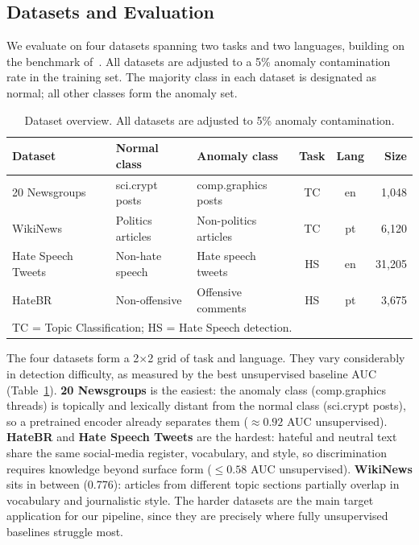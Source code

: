 \documentclass[12pt]{article}
\begin{document}
\subsection{Datasets and Evaluation}
\label{sec:datasets}

We evaluate on four datasets spanning two tasks and two languages,
building on the benchmark of~\cite{stil}. All datasets are adjusted to a 5\% anomaly
contamination rate in the training set. The majority class in each dataset is designated
as normal; all other classes form the anomaly set.

\renewcommand{\arraystretch}{0.9}
\begin{table}[ht]
\small
\centering
\caption{Dataset overview. All datasets are adjusted to 5\% anomaly contamination.}
\label{tab:datasets}
\begin{tabular}{lp{2.2cm}p{2.2cm}ccr}
\toprule
\textbf{Dataset} & \textbf{Normal class} & \textbf{Anomaly class} & \textbf{Task} & \textbf{Lang} & \textbf{Size} \\
\midrule
20 Newsgroups~\cite{lang1995newsweeder}          & sci.crypt posts   & comp.graphics posts   & TC & en & 1,048  \\
WikiNews~\cite{10.1371/journal.pone.0296929}     & Politics articles & Non-politics articles & TC & pt & 6,120  \\
Hate Speech Tweets~\cite{sharma2018hate}         & Non-hate speech   & Hate speech tweets    & HS & en & 31,205 \\
HateBR~\cite{DBLP:journals/corr/abs-2010-04543} & Non-offensive     & Offensive comments    & HS & pt & 3,675  \\
\bottomrule
\multicolumn{6}{l}{\scriptsize TC = Topic Classification; HS = Hate Speech detection.}
\end{tabular}
\end{table}

The four datasets form a 2$\times$2 grid of task and language.
They vary considerably in detection difficulty, as measured by the best unsupervised
baseline AUC (Table~\ref{tab:datasets}).
\textbf{20 Newsgroups} is the easiest: the anomaly class (comp.graphics threads)
is topically and lexically distant from the normal class (sci.crypt posts),
so a pretrained encoder already separates them ($\approx 0.92$ AUC unsupervised).
\textbf{HateBR} and \textbf{Hate Speech Tweets} are the hardest: hateful and
neutral text share the same social-media register, vocabulary, and style,
so discrimination requires knowledge beyond surface form ($\leq 0.58$ AUC unsupervised).
\textbf{WikiNews} sits in between (0.776): articles from different topic sections
partially overlap in vocabulary and journalistic style.
The harder datasets are the main target application for our pipeline,
since they are precisely where fully unsupervised baselines struggle most.
\end{document}
